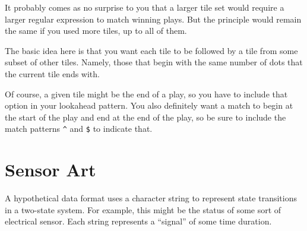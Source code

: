 \newpage

It probably comes as no surprise to you that a larger tile set would
require a larger regular expression to match winning plays. But the
principle would remain the same if you used more tiles, up to all of
them.

The basic idea here is that you want each tile to be followed by a tile
from some subset of other tiles. Namely, those that begin with the same
number of dots that the current tile ends with.

Of course, a given tile might be the end of a play, so you have to
include that option in your lookahead pattern. You also definitely want
a match to begin at the start of the play and end at the end of the
play, so be sure to include the match patterns \texttt{\^{}} and
\texttt{\$} to indicate that.

\begin{Shaded}
\begin{Highlighting}[]
\OperatorTok{\textgreater{}\textgreater{}\textgreater{}}\OperatorTok{=} 
\OperatorTok{\textgreater{}\textgreater{}\textgreater{}}\OperatorTok{=} 
\OperatorTok{\textgreater{}\textgreater{}\textgreater{}}\OperatorTok{=} 
\OperatorTok{\textgreater{}\textgreater{}\textgreater{}}
\OperatorTok{\textless{}}\OperatorTok{;}\OperatorTok{=}\NormalTok{(}\NormalTok{, }\OperatorTok{=}\OperatorTok{\textgreater{}}
\OperatorTok{\textgreater{}\textgreater{}\textgreater{}} 
\end{Highlighting}
\end{Shaded}

\newpage

\hypertarget{sensor-art}{%
\section{Sensor Art}\label{sensor-art}}

A hypothetical data format uses a character string to represent state
transitions in a two-state system. For example, this might be the status
of some sort of electrical sensor. Each string represents a ``signal''
of some time duration.

